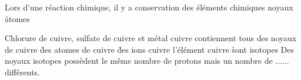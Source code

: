  \q
Lors d'une réaction chimique, il y a conservation des
\rv
éléments chimiques
\rv
noyaux
\r
atomes

\q
Chlorure de cuivre, sulfate de cuivre et métal cuivre contiennent tous
\rv
des noyaux de cuivre
\r
des atomes de cuivre
\r
des ions cuivre
\rv
l'élément cuivre
\r
sont isotopes
\q
   Des noyaux isotopes possèdent le même nombre de protons mais un nombre de ...... différents.

